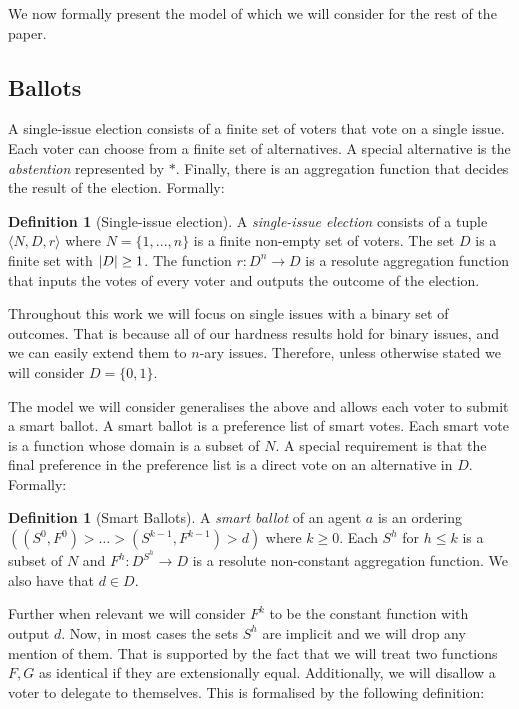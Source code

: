 \documentclass[11pt,a4paper, titlepage]{article}
\DeclarePairedDelimiter\abs{\lvert}{\rvert}
\theoremstyle{definition}
\newtheorem{definition}[theorem]{Definition}
\begin{document}
We now formally present the model of \citet{grandi} which we will consider for the rest of the paper.

\subsection{Ballots}

A single-issue election consists of a finite set of voters that vote on a single issue. 
Each voter can choose from a  finite set of alternatives. 
A special alternative is the \emph{abstention} represented by $*$. 
Finally, there is an aggregation function that decides the result of the election. 
Formally:

\begin{definition}[Single-issue election]
    A \emph{single-issue election} consists of a tuple $\langle N, D, r\rangle $ where $N = \{1,..., n\} $ is a finite non-empty set of voters. The set $D$ is a finite set with $\abs{D} \geq 1$. The function $r \colon D^n \longrightarrow D$ is a resolute aggregation function that inputs the votes of every voter and outputs the outcome of the election.
\end{definition}

Throughout this work we will focus on single issues with a binary set of outcomes. 
That is because all of our hardness results hold for binary issues, and we can easily extend them to $n$-ary issues. 
Therefore, unless otherwise stated we will consider $D = \{0, 1\}$.

The model we will consider generalises the above and allows each voter to submit a smart ballot. 
A smart ballot is a preference list of smart votes. 
Each smart vote is a function whose domain is a subset of $N$. 
A special requirement is that the final preference in the preference list is a direct vote on an alternative in $D$. 
Formally:

\begin{definition}[Smart Ballots]
    A \emph{smart ballot} of an agent $a$ is an ordering $( (S^0, F^0) > \ldots > (S^{k-1}, F^{k-1}) > d)$ where $k \geq 0$. Each $S^h$ for $h \leq k$ is a subset of $N$ and $F^h \colon D^{S^h} \longrightarrow D$ is a resolute non-constant aggregation function. We also have that $d \in D$.   
\end{definition}

Further when relevant we will consider $F^{k}$ to be the constant function with output $d$. 
Now, in most cases the sets $S^h$ are implicit and we will drop any mention of them. 
That is supported by the fact that we will treat two functions $F, G$ as identical if they are extensionally equal. 
Additionally, we will disallow a voter to delegate to themselves. 
This is formalised by the following definition:
\end{document}
